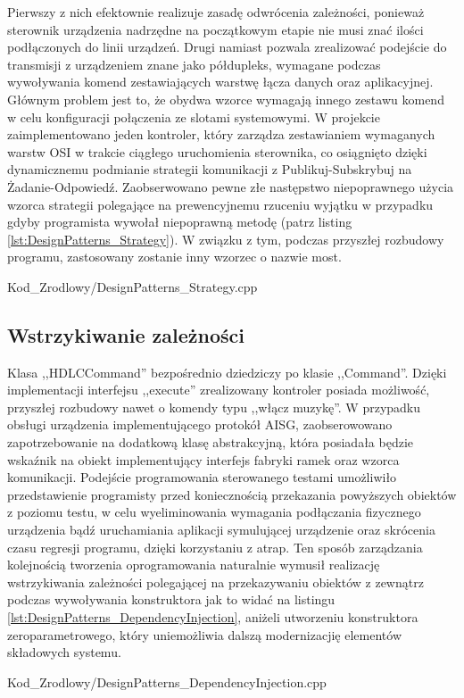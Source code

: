         Pierwszy z nich efektownie realizuje zasadę odwrócenia zależności, ponieważ sterownik urządzenia nadrzędne na początkowym etapie nie musi znać
        ilości podłączonych do linii urządzeń. Drugi namiast pozwala zrealizować podejście do transmisji z urządzeniem znane jako półdupleks, wymagane podczas
        wywoływania komend zestawiających warstwę łącza danych oraz aplikacyjnej. Głównym problem jest to, że obydwa wzorce wymagają innego zestawu komend w celu
        konfiguracji połączenia ze slotami systemowymi. W projekcie zaimplementowano jeden kontroler, który zarządza zestawianiem wymaganych warstw OSI w trakcie
        ciągłego uruchomienia sterownika, co osiągnięto dzięki dynamicznemu podmianie strategii komunikacji z Publikuj-Subskrybuj na Żadanie-Odpowiedź.
        Zaobserwowano pewne złe następstwo niepoprawnego użycia wzorca strategii polegające na prewencyjnemu rzuceniu wyjątku w przypadku gdyby programista wywołał niepoprawną metodę
        (patrz listing \ref{lst:DesignPatterns_Strategy}).
        W związku z tym, podczas przyszłej rozbudowy programu, zastosowany zostanie inny wzorzec o nazwie most.
        \newpage
        
        {Kod_Zrodlowy/DesignPatterns_Strategy.cpp}
    \newpage
    \subsection{Wstrzykiwanie zależności}
        Klasa ,,HDLCCommand'' bezpośrednio dziedziczy po klasie ,,Command''. Dzięki implementacji interfejsu ,,execute'' zrealizowany kontroler posiada możliwość,
        przyszłej rozbudowy nawet o komendy typu ,,włącz muzykę''. W przypadku obsługi urządzenia implementującego protokół AISG, zaobserowowano zapotrzebowanie
        na dodatkową klasę abstrakcyjną, która posiadała będzie wskaźnik na obiekt implementujący interfejs fabryki ramek oraz wzorca komunikacji.
        Podejście programowania sterowanego testami umożliwiło przedstawienie programisty przed koniecznością przekazania powyższych obiektów z poziomu testu, w celu wyeliminowania
        wymagania podłączania fizycznego urządzenia bądź uruchamiania aplikacji symulującej urządzenie oraz skrócenia czasu regresji programu, dzięki
        korzystaniu z atrap.
        Ten sposób zarządzania kolejnością tworzenia oprogramowania naturalnie wymusił realizację wstrzykiwania zależności polegającej na
        przekazywaniu obiektów z zewnątrz podczas wywoływania konstruktora jak to widać na listingu \ref{lst:DesignPatterns_DependencyInjection}, aniżeli utworzeniu konstruktora zeroparametrowego, 
        który uniemożliwia dalszą modernizacjię elementów składowych systemu.
        
        {Kod_Zrodlowy/DesignPatterns_DependencyInjection.cpp}
